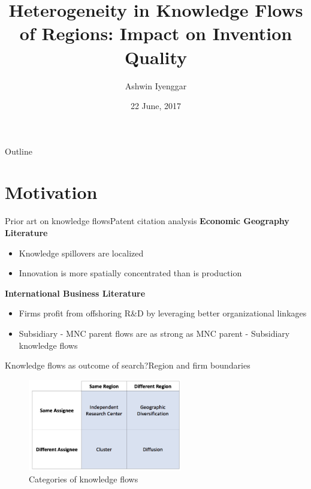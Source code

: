 \documentclass{beamer}
\title{Heterogeneity in Knowledge Flows of Regions: Impact on Invention Quality}
\author{Ashwin Iyenggar}
\institute[Indian Institute of Management Bangalore] 
{
  Strategy Area\\
  Indian Institute of Management Bangalore
}
\date{22 June, 2017}
\begin{document}
\begin{frame}
  \titlepage
\end{frame}

\begin{frame}{Outline}
  \tableofcontents
\end{frame}


\section{Motivation}

\begin{frame}{Prior art on knowledge flows}{Patent citation analysis}
\textbf{Economic Geography Literature}
\begin{itemize}
\item{Knowledge spillovers are localized \citep*{Jaffe1993}}
\item{Innovation is more spatially concentrated than is production \citep{Feldman1994a}}
\end{itemize}

\textbf{International Business Literature}
\begin{itemize}
\item{Firms profit from offshoring R\&D by leveraging better organizational linkages \citep*{Zhao2006}}
\item{Subsidiary - MNC parent flows are as strong as MNC parent - Subsidiary knowledge flows \citep{Singh2007}}
\end{itemize}
\end{frame}

\begin{frame}{Knowledge flows as outcome of search?}{Region and firm boundaries}
\begin{figure}[h!]
\begin{centering}
  \includegraphics[width=0.6\textwidth]{2x2old}
  \caption{Categories of knowledge flows}
   \label{fig:2x2old}
\end{centering}
\end{figure}
\end{frame}
\end{document}

